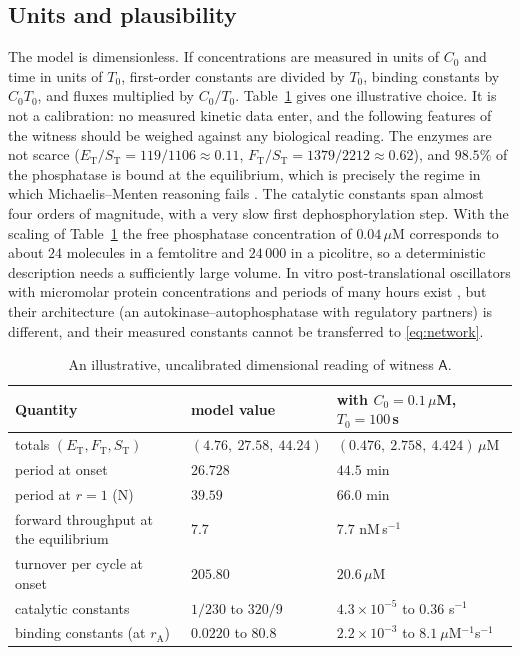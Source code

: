 \documentclass[11pt,a4paper]{article}
\theoremstyle{plain}
\theoremstyle{definition}
\theoremstyle{remark}
\newcommand{\ET}{E_{\mathrm T}}
\newcommand{\FT}{F_{\mathrm T}}
\newcommand{\ST}{S_{\mathrm T}}
\newcommand{\rA}{r_{\mathrm A}}
\newcommand{\WA}{\mathsf A}
\newcommand{\evN}{\textsf{N}}
\begin{document}
\subsection{Units and plausibility}
The model is dimensionless. If concentrations are measured in units of $C_0$ and time in units of $T_0$, first-order constants are divided by $T_0$, binding constants by $C_0T_0$, and fluxes multiplied by $C_0/T_0$. Table~\ref{tab:scale} gives one illustrative choice. It is not a calibration: no measured kinetic data enter, and the following features of the witness should be weighed against any biological reading. The enzymes are not scarce ($\ET/\ST=119/1106\approx0.11$, $\FT/\ST=1379/2212\approx0.62$), and $98.5\%$ of the phosphatase is bound at the equilibrium, which is precisely the regime in which Michaelis--Menten reasoning fails \cite{Bluthgen06,Ciliberto07}. The catalytic constants span almost four orders of magnitude, with a very slow first dephosphorylation step. With the scaling of Table~\ref{tab:scale} the free phosphatase concentration of $0.04\,\mu$M corresponds to about $24$ molecules in a femtolitre and $24\,000$ in a picolitre, so a deterministic description needs a sufficiently large volume. In vitro post-translational oscillators with micromolar protein concentrations and periods of many hours exist \cite{Phong13}, but their architecture (an autokinase--autophosphatase with regulatory partners) is different, and their measured constants cannot be transferred to \eqref{eq:network}.

\begin{table}[htbp]
\centering\small
\begin{tabular}{lll}
\toprule
Quantity & model value & with $C_0=0.1\,\mu$M, $T_0=100$\,s\\
\midrule
totals $(\ET,\FT,\ST)$ & $(4.76,\ 27.58,\ 44.24)$ & $(0.476,\ 2.758,\ 4.424)\,\mu$M\\
period at onset & $26.728$ & $44.5$ min\\
period at $r=1$ (\evN) & $39.59$ & $66.0$ min\\
forward throughput at the equilibrium & $7.7$ & $7.7$ nM\,s$^{-1}$\\
turnover per cycle at onset & $205.80$ & $20.6\,\mu$M\\
catalytic constants & $1/230$ to $320/9$ & $4.3\times10^{-5}$ to $0.36$ s$^{-1}$\\
binding constants (at $\rA$) & $0.0220$ to $80.8$ & $2.2\times10^{-3}$ to $8.1\ \mu$M$^{-1}$s$^{-1}$\\
\bottomrule
\end{tabular}
\caption{An illustrative, uncalibrated dimensional reading of witness $\WA$.}
\label{tab:scale}
\end{table}
\end{document}
